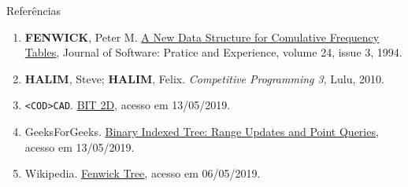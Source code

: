 \begin{frame}[fragile]{Referências}

    \begin{enumerate}
        \item \textbf{FENWICK}, Peter M. \href{http://citeseerx.ist.psu.edu/viewdoc/download?doi=10.1.1.14.8917&rep=rep1&type=pdf}{A New Data Structure for Comulative Frequency Tables}, Journal of Software: Pratice and Experience, volume 24, issue 3, 1994.

        \item \textbf{HALIM}, Steve; \textbf{HALIM}, Felix. \textit{Competitive Programming 3}, Lulu, 2010.
        \item \texttt{<COD>CAD}. \href{http://www.codcad.com/lesson/62}{BIT 2D}, acesso em 13/05/2019.

        \item GeeksForGeeks. \href{https://www.geeksforgeeks.org/binary-indexed-tree-range-updates-point-queries/}{Binary Indexed Tree: Range Updates and Point Queries}, acesso em 13/05/2019.

        \item Wikipedia. \href{https://en.wikipedia.org/wiki/Fenwick\_tree}{Fenwick Tree}, acesso em 06/05/2019.

    \end{enumerate}

\end{frame}
